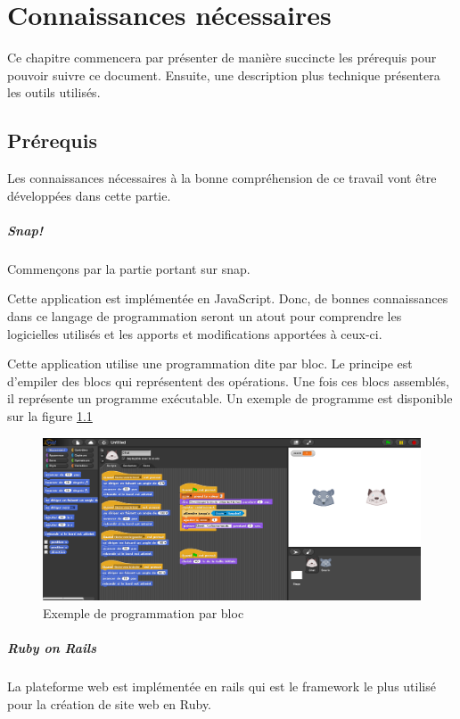 \chapter{Connaissances nécessaires}
Ce chapitre commencera par présenter de manière succincte les prérequis pour pouvoir suivre ce document. Ensuite, une description plus technique présentera les outils utilisés.

\section{Prérequis}
Les connaissances nécessaires à la bonne compréhension de ce travail vont être développées dans cette partie.

\paragraph{Snap!}
Commençons par la partie portant sur \gls{snap}. 

Cette application est implémentée en JavaScript. Donc, de bonnes connaissances dans ce langage de programmation seront un atout pour comprendre les logicielles utilisés et les apports et modifications apportées à ceux-ci.

Cette application utilise une programmation dite par bloc. Le principe est d'empiler des blocs qui représentent des opérations. Une fois ces blocs assemblés, il représente un programme exécutable. Un exemple de programme est disponible sur la figure \ref{fig:prog}

\begin{figure}[]
  \begin{center}
  \includegraphics[width=\textwidth]{content/4-prerequis/images/snap}
        \caption{Exemple de programmation par bloc}
    \label{fig:prog}
  \end{center}
\end{figure}


\paragraph{Ruby on Rails}
La plateforme web est implémentée en \gls{rails} qui est le framework le plus utilisé pour la création de site web en Ruby. 

